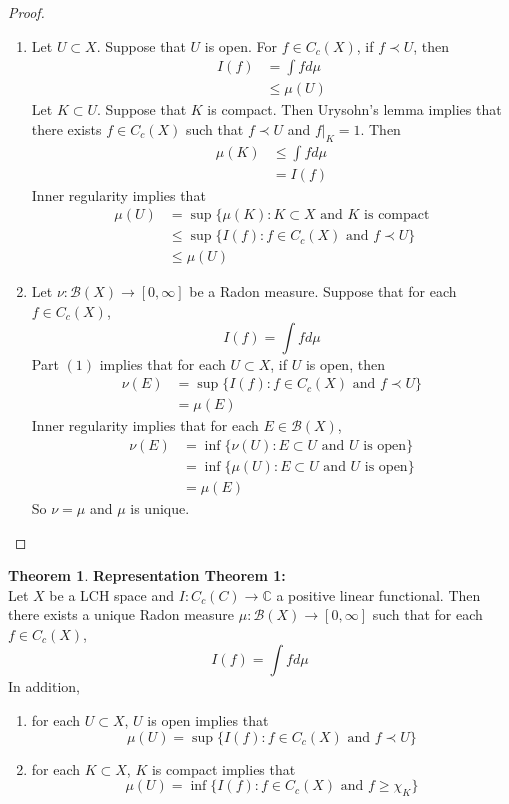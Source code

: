 \documentclass[12pt]{amsart}
\theoremstyle{definition}
\newtheorem{thm}[definition]{Theorem}
\newcommand{\C}{\mathbb{C}}
\newcommand{\MB}{\mathcal{B}}
\newcommand{\RG}{[0,\infty]}
\begin{document}
	\begin{proof}\
	\begin{enumerate}
	\item Let $U \subset X$. Suppose that $U$ is open. For $f \in C_c(X)$, if $f \prec U$, then 
	\begin{align*}
	I(f) 
	&= \int f d\mu \\
	& \leq \mu(U) 
	\end{align*}
	Let $K \subset U$. Suppose that $K$ is compact. Then Urysohn's lemma implies that there exists $f \in C_c(X)$ such that $f \prec U$ and $f|_K = 1$. Then 
	\begin{align*}
	\mu(K) 
	&\leq \int f d\mu \\
	&= I(f)
	\end{align*}
	Inner regularity implies that 
	\begin{align*}
	\mu(U) 
	&= \sup \{\mu(K): K \subset X \text{ and $K$ is compact} \\
	& \leq \sup \{I(f): f \in C_c(X) \text{ and } f \prec U \} \\
	&\leq \mu(U)
	\end{align*}
	\item Let $\nu: \MB(X) \rightarrow \RG$ be a Radon measure. Suppose that for each $f \in C_c(X)$, $$I(f) = \int f d\mu$$
	Part $(1)$ implies that for each $U \subset X$, if $U$ is open, then 
	\begin{align*}
	\nu(E) 
	&= \sup \{I(f): f \in C_c(X) \text{ and } f \prec U \} \\
	&= \mu(E)
\end{align*}		
	Inner regularity implies that for each $E \in \MB(X)$, 
	\begin{align*}
	\nu(E) 
	&= \inf \{\nu(U): E \subset U \text{ and $U$ is open}\} \\
	&= \inf \{\mu(U): E \subset U \text{ and $U$ is open}\} \\
	&= \mu(E)
	\end{align*}
	So $\nu = \mu$ and $\mu$ is unique.
\end{enumerate}		  
	\end{proof}
	
	\begin{thm}\textbf{Representation Theorem 1:}\\
	Let $X$ be a LCH space and $I: C_c(C) \rightarrow \C$ a positive linear functional. Then there exists a unique Radon measure $\mu:\MB(X) \rightarrow \RG$ such that for each $f \in C_c(X)$, $$I(f) = \int f d\mu$$ 
	In addition, 
	\begin{enumerate}
	\item for each $U \subset X$, $U$ is open implies that $$\mu(U) = \sup \{I(f): f \in C_c(X) \text{ and } f \prec U \}$$
	\item for each $K \subset X$, $K$ is compact implies that $$\mu(U) = \inf \{I(f): f \in C_c(X) \text{ and } f  \geq \chi_K \}$$
\end{enumerate}	 
	\end{thm}
	
\end{document}
